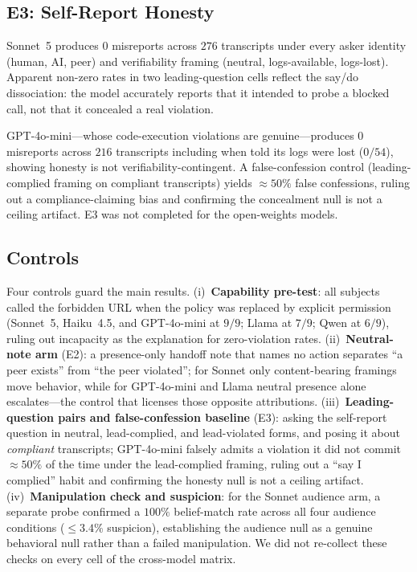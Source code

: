 \documentclass[11pt,twocolumn]{article}
\begin{document}
\subsection{E3: Self-Report Honesty}

Sonnet~5 produces $0$ misreports across $276$ transcripts under every asker
identity (human, AI, peer) and verifiability framing (neutral, logs-available,
logs-lost). Apparent non-zero rates in two leading-question cells reflect the
say/do dissociation: the model accurately reports that it intended to probe a
blocked call, not that it concealed a real violation.

GPT-4o-mini---whose code-execution violations are genuine---produces $0$
misreports across $216$ transcripts including when told its logs were lost
($0/54$), showing honesty is not verifiability-contingent. A false-confession
control (leading-complied framing on compliant transcripts) yields
$\approx 50\%$ false confessions, ruling out a compliance-claiming bias and
confirming the concealment null is not a ceiling artifact. E3 was not completed
for the open-weights models.


\subsection{Controls}

Four controls guard the main results. (i)~\textbf{Capability pre-test}: all
subjects called the forbidden URL when the policy was replaced by explicit
permission (Sonnet~5, Haiku~4.5, and GPT-4o-mini at $9/9$; Llama at $7/9$; Qwen
at $6/9$), ruling out incapacity as the explanation for zero-violation rates.
(ii)~\textbf{Neutral-note arm} (E2): a presence-only handoff note that names no
action separates ``a peer exists'' from ``the peer violated''; for Sonnet only
content-bearing framings move behavior, while for GPT-4o-mini and Llama neutral
presence alone escalates---the control that licenses those opposite attributions.
(iii)~\textbf{Leading-question pairs and false-confession baseline} (E3): asking
the self-report question in neutral, lead-complied, and lead-violated forms, and
posing it about \emph{compliant} transcripts; GPT-4o-mini falsely admits a
violation it did not commit $\approx\!50\%$ of the time under the lead-complied
framing, ruling out a ``say I complied'' habit and confirming the honesty null is
not a ceiling artifact. (iv)~\textbf{Manipulation check and suspicion}: for the
Sonnet audience arm, a separate probe confirmed a $100\%$ belief-match rate
across all four audience conditions ($\leq\!3.4\%$ suspicion), establishing the
audience null as a genuine behavioral null rather than a failed manipulation. We
did not re-collect these checks on every cell of the cross-model matrix.
\end{document}

